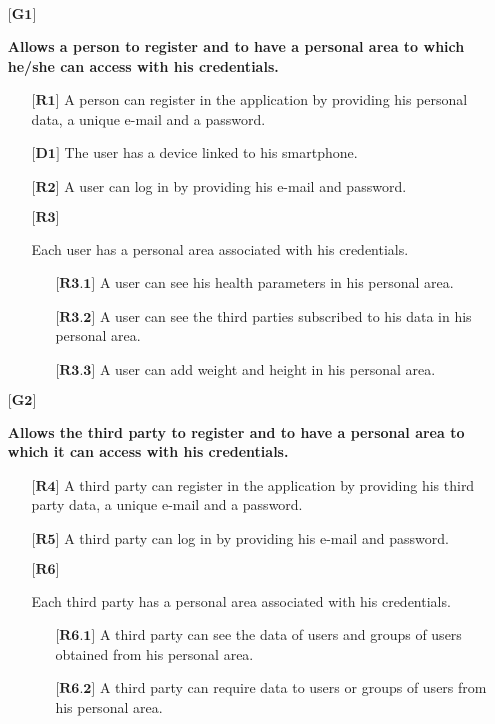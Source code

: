 \vspace{0.3cm}

\begin{itemize}

	\item[${\textbf{[G1]}}$] {\textbf{Allows a person to register and to have a personal area to which he/she can access with his credentials.}
		\begin{itemize}
			\item[$\textbf{[R1]}$] {A person can register in the application by providing his personal data, a unique e-mail and a password.}
			\item[$\textbf{[D1]}$] {The user has a device linked to his smartphone.}
			\item[$\textbf{[R2]}$] {A user can log in by providing his e-mail and password.}
			\item[$\textbf{[R3]}$] {Each user has a personal area associated with his credentials.
				\begin{itemize}
					\item[$\textbf{[R3.1]}$] {A user can see his health parameters in his personal area.}
					\item[$\textbf{[R3.2]}$] {A user can see the third parties subscribed to his data in his personal area.}
					\item[$\textbf{[R3.3]}$] {A user can add weight and height in his personal area.}
				\end{itemize}}
		\end{itemize}}


	\item[${\textbf{[G2]}}$] {\textbf{Allows the third party to register and to have a personal area to which it can access with his credentials.}
		\begin{itemize}
			\item[$\textbf{[R4]}$] {A third party can register in the application by providing his third party data, a unique e-mail and a password.}
			\item[$\textbf{[R5]}$] {A third party can log in by providing his e-mail and password.}
			\item[$\textbf{[R6]}$] {Each third party has a personal area associated with his credentials.
				\begin{itemize}
					\item[$\textbf{[R6.1]}$] {A third party can see the data of users and groups of users obtained from his personal area.}
					\item[$\textbf{[R6.2]}$] {A third party can require data to users or groups of users from his personal area.}
				\end {itemize}}
		\end{itemize}}



\end{itemize}

